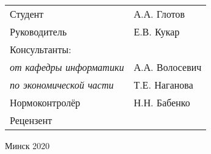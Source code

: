 \begin{titlepage}
\begin{center}
    \begin{tabular}{ p{}p{} }
      Студент & А.А. Глотов \\
      Руководитель & Е.В. Кукар \\
      Консультанты: &\\
      \hspace*{3ex}\emph{от кафедры информатики} & А.А. Волосевич \\
      \hspace*{3ex}\emph{по экономической части} & Т.Е. Наганова \\
      Нормоконтролёр & Н.Н. Бабенко \\
      
      Рецензент &
    \end{tabular}
    
    \vfill
    {\normalsize Минск 2020}
  \end{center}
\end{titlepage}
